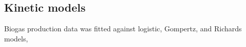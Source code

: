 \subsection{Kinetic models}
Biogas production data was fitted against logistic, Gompertz, and
Richards models, 